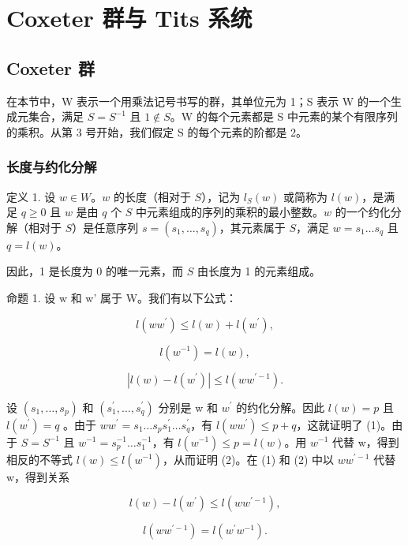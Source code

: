 \chapter{Coxeter 群与 Tits 系统}

\section{Coxeter 群}

在本节中，W 表示一个用乘法记号书写的群，其单位元为 1；S 表示 W 的一个生成元集合，满足 \(S = S^{-1}\) 且 \(1 \notin S\)。W 的每个元素都是 S 中元素的某个有限序列的乘积。从第 3 号开始，我们假定 S 的每个元素的阶都是 2。

\subsection{长度与约化分解}

定义 1. 设 \(w \in W\)。\(w\) 的长度（相对于 \(S\)），记为 \(l_{S}(w)\) 或简称为 \(l(w)\)，是满足 \(q \geqslant 0\) 且 \(w\) 是由 \(q\) 个 \(S\) 中元素组成的序列的乘积的最小整数。\(w\) 的一个约化分解（相对于 \(S\)）是任意序列 \(s = (s_1, \ldots, s_q)\)，其元素属于 \(S\)，满足 \(w = s_1 \ldots s_q\) 且 \(q = l(w)\)。

因此，1 是长度为 0 的唯一元素，而 \(S\) 由长度为 1 的元素组成。

命题 1. 设 w 和 w' 属于 W。我们有以下公式：

\[
l (w w ^ {\prime}) \leqslant l (w) + l (w ^ {\prime}),\tag{1}
\]

\[
l (w ^ {- 1}) = l (w),\tag{2}
\]

\[
\left| l (w) - l \left(w ^ {\prime}\right) \right| \leqslant l \left(w w ^ {\prime - 1}\right).\tag{3}
\]

设 \((s_{1},\ldots,s_{p})\) 和 \((s_{1}^{\prime},\ldots,s_{q}^{\prime})\) 分别是 w 和 \(w^{\prime}\) 的约化分解。因此 \(l(w)=p\) 且 \(l(w^{\prime})=q\) 。由于 \(ww^{\prime}=s_{1}\ldots s_{p}s_{1}^{\prime}\ldots s_{q}^{\prime}\)，有 \(l(ww^{\prime})\leqslant p+q\)，这就证明了 (1)。由于 \(S=S^{-1}\) 且 \(w^{-1}=s_{p}^{-1}\ldots s_{1}^{-1}\)，有 \(l(w^{-1})\leqslant p=l(w)\)。用 \(w^{-1}\) 代替 w，得到相反的不等式 \(l(w)\leqslant l(w^{-1})\)，从而证明 (2)。在 (1) 和 (2) 中以 \(ww^{\prime-1}\) 代替 w，得到关系

\[
l (w) - l \left(w ^ {\prime}\right) \leqslant l \left(w w ^ {\prime - 1}\right),\tag{4}
\]

\[
l \left(w w ^ {\prime - 1}\right) = l \left(w ^ {\prime} w ^ {- 1}\right).\tag{5}
\]

